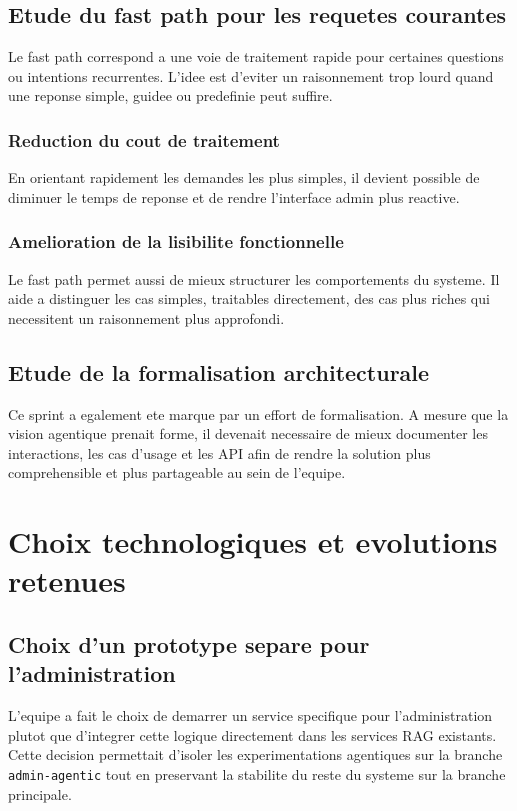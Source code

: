 \subsection{Etude du fast path pour les requetes courantes}

Le fast path correspond a une voie de traitement rapide pour certaines questions ou intentions recurrentes. L'idee est d'eviter un raisonnement trop lourd quand une reponse simple, guidee ou predefinie peut suffire.

\subsubsection{Reduction du cout de traitement}

En orientant rapidement les demandes les plus simples, il devient possible de diminuer le temps de reponse et de rendre l'interface admin plus reactive.

\subsubsection{Amelioration de la lisibilite fonctionnelle}

Le fast path permet aussi de mieux structurer les comportements du systeme. Il aide a distinguer les cas simples, traitables directement, des cas plus riches qui necessitent un raisonnement plus approfondi.

\subsection{Etude de la formalisation architecturale}

Ce sprint a egalement ete marque par un effort de formalisation. A mesure que la vision agentique prenait forme, il devenait necessaire de mieux documenter les interactions, les cas d'usage et les API afin de rendre la solution plus comprehensible et plus partageable au sein de l'equipe.

\section{Choix technologiques et evolutions retenues}

\subsection{Choix d'un prototype separe pour l'administration}

L'equipe a fait le choix de demarrer un service specifique pour l'administration plutot que d'integrer cette logique directement dans les services RAG existants. Cette decision permettait d'isoler les experimentations agentiques sur la branche \texttt{admin-agentic} tout en preservant la stabilite du reste du systeme sur la branche principale.

